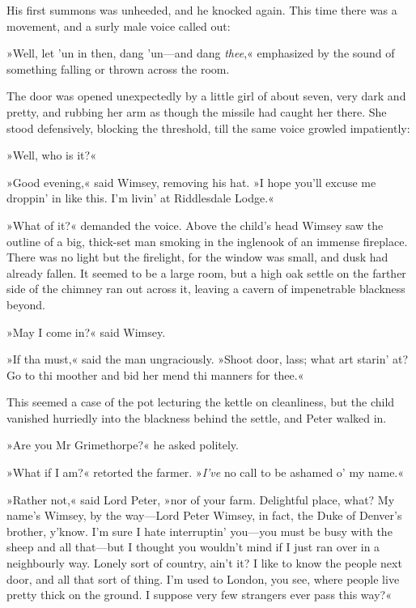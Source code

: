 His first summons was unheeded, and he knocked again. This time there was a movement, and a surly male voice called out:

»Well, let 'un in then, dang 'un\allowbreak---\allowbreak and dang \textit{thee},« emphasized by the sound of something falling or thrown across the room.

The door was opened unexpectedly by a little girl of about seven, very dark and pretty, and rubbing her arm as though the missile had caught her there. She stood defensively, blocking the threshold, till the same voice growled impatiently:

»Well, who is it?«

»Good evening,« said Wimsey, removing his hat. »I hope you'll excuse me droppin' in like this. I'm livin' at Riddlesdale Lodge.«

»What of it?« demanded the voice. Above the child's head Wimsey saw the outline of a big, thick-set man smoking in the inglenook of an immense fireplace. There was no light but the firelight, for the window was small, and dusk had already fallen. It seemed to be a large room, but a high oak settle on the farther side of the chimney ran out across it, leaving a cavern of impenetrable blackness beyond.

»May I come in?« said Wimsey.

»If tha must,« said the man ungraciously. »Shoot door, lass; what art starin' at? Go to thi moother and bid her mend thi manners for thee.«

This seemed a case of the pot lecturing the kettle on cleanliness, but the child vanished hurriedly into the blackness behind the settle, and Peter walked in.

»Are you Mr Grimethorpe?« he asked politely.

»What if I am?« retorted the farmer. »\textit{I've} no call to be ashamed o' my name.«

»Rather not,« said Lord Peter, »nor of your farm. Delightful place, what? My name's Wimsey, by the way\allowbreak---\allowbreak Lord Peter Wimsey, in fact, the Duke of Denver's brother, y'know. I'm sure I hate interruptin' you\allowbreak---\allowbreak you must be busy with the sheep and all that\allowbreak---\allowbreak but I thought you wouldn't mind if I just ran over in a neighbourly way. Lonely sort of country, ain't it? I like to know the people next door, and all that sort of thing. I'm used to London, you see, where people live pretty thick on the ground. I suppose very few strangers ever pass this way?«


